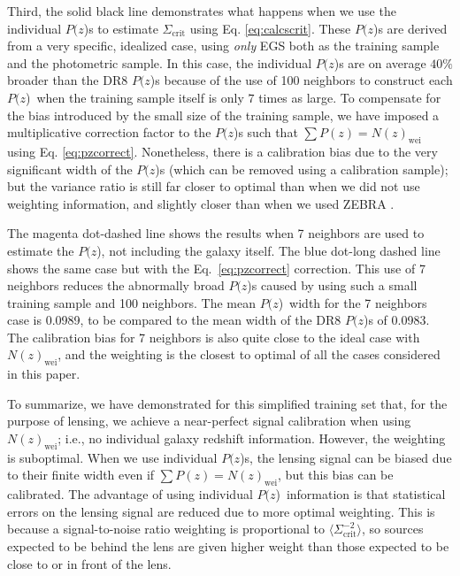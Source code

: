 \documentclass[12pt,preprint]{aastex}
\newcommand{\pofz}{$P(z$)}
\begin{document}
Third, the solid black line demonstrates what happens when we use the individual
\pofz s to estimate $\Sigma_\mathrm{crit}$ using Eq. \ref{eq:calcscrit}.  These
\pofz s are derived from a very specific, idealized case, using {\em only} EGS
both as the training sample and the photometric sample.  In this case, the
individual \pofz s are on average $40\%$ broader than the DR8 \pofz s because of
the use of 100 neighbors to construct each \pofz\ when the training sample
itself is only $7$ times as large.  To compensate for the bias introduced by
the small size of the training sample, we have imposed a multiplicative
correction factor to the \pofz s such that $\sum P(z) = N(z)_\mathrm{wei}$ using
Eq. \ref{eq:pzcorrect}.  Nonetheless, there is a calibration bias due to the
very significant width of the \pofz s (which can be removed using a calibration
sample); but the variance ratio is still far closer to optimal than when we did
not use weighting information, and slightly closer than when we used ZEBRA
\photoz.  

The magenta dot-dashed line shows the results when 7 neighbors are used to
estimate the \pofz, not including the galaxy itself. The blue dot-long dashed
line shows the same case but with the Eq.~\ref{eq:pzcorrect} correction.  This
use of 7 neighbors reduces the abnormally broad \pofz s caused by using such a
small training sample and 100 neighbors.  The mean \pofz\ width for the 7
neighbors case is 0.0989, to be compared to the mean width of the DR8 \pofz s of
0.0983. The calibration bias for 7 neighbors is also quite close to the ideal
case with $N(z)_\mathrm{wei}$, and the weighting is the closest to optimal of
all the cases considered in this paper.

To summarize, we have demonstrated for this simplified training set that, for
the purpose of lensing, we achieve a near-perfect signal calibration when using
$N(z)_\mathrm{wei}$; i.e., no individual galaxy redshift information.  However,
the weighting is suboptimal.  When we use individual \pofz s, the lensing
signal can be biased due to their finite width even if $\sum P(z) =
N(z)_\mathrm{wei}$, but this bias can be calibrated.  The advantage of using
individual \pofz\ information is that statistical errors on the lensing signal
are reduced due to more optimal weighting.  This is because a signal-to-noise
ratio weighting is proportional to $\langle \Sigma_{\mathrm{crit}}^{-2}
\rangle$, so sources expected to be behind the lens are given higher weight
than those expected to be close to or in front of the lens.
\end{document}
